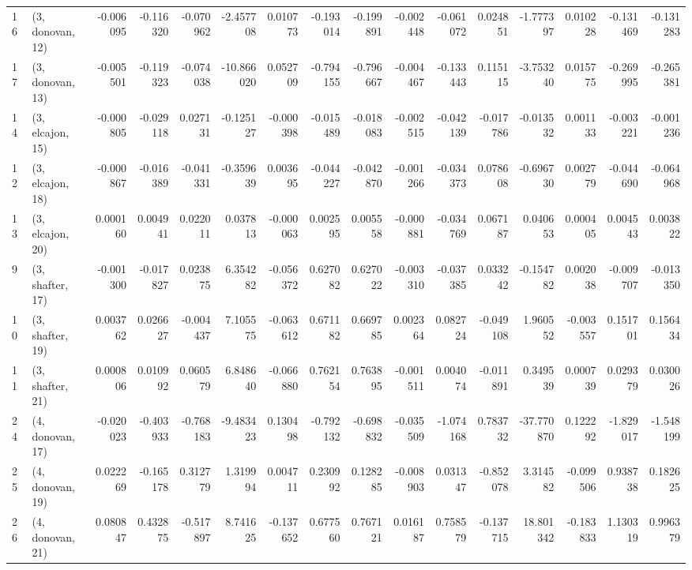 \begin{tabular}{llrrrrrrrrrrrrrr}
16 &  (3, donovan, 12) &  -0.006095 & -0.116320 & -0.070962 &  -2.457708 &  0.010773 &  -0.193014 & -0.199891 & -0.002448 & -0.061072 &  0.024851 &  -1.777397 &  0.010228 & -0.131469 & -0.131283 \\
17 &  (3, donovan, 13) &  -0.005501 & -0.119323 & -0.074038 & -10.866020 &  0.052709 &  -0.794155 & -0.796667 & -0.004467 & -0.133443 &  0.115115 &  -3.753240 &  0.015775 & -0.269995 & -0.265381 \\
14 &  (3, elcajon, 15) &  -0.000805 & -0.029118 &  0.027131 &  -0.125127 & -0.000398 &  -0.015489 & -0.018083 & -0.002515 & -0.042139 & -0.017786 &  -0.013532 &  0.001133 & -0.003221 & -0.001236 \\
12 &  (3, elcajon, 18) &  -0.000867 & -0.016389 & -0.041331 &  -0.359639 &  0.003695 &  -0.044227 & -0.042870 & -0.001266 & -0.034373 &  0.078608 &  -0.696730 &  0.002779 & -0.044690 & -0.064968 \\
13 &  (3, elcajon, 20) &   0.000160 &  0.004941 &  0.022011 &   0.037813 & -0.000063 &   0.002595 &  0.005558 & -0.000881 & -0.034769 &  0.067187 &   0.040653 &  0.000405 &  0.004543 &  0.003822 \\
9  &  (3, shafter, 17) &  -0.001300 & -0.017827 &  0.023875 &   6.354282 & -0.056372 &   0.627082 &  0.627022 & -0.003310 & -0.037385 &  0.033242 &  -0.154782 &  0.002038 & -0.009707 & -0.013350 \\
10 &  (3, shafter, 19) &   0.003762 &  0.026627 & -0.004437 &   7.105575 & -0.063612 &   0.671182 &  0.669785 &  0.002364 &  0.082724 & -0.049108 &   1.960552 & -0.003557 &  0.151701 &  0.156434 \\
11 &  (3, shafter, 21) &   0.000806 &  0.010992 &  0.060579 &   6.848640 & -0.066880 &   0.762154 &  0.763895 & -0.001511 &  0.004074 & -0.011891 &   0.349539 &  0.000739 &  0.029379 &  0.030026 \\
24 &  (4, donovan, 17) &  -0.020023 & -0.403933 & -0.768183 &  -9.483423 &  0.130498 &  -0.792132 & -0.698832 & -0.035509 & -1.074168 &  0.783732 & -37.770870 &  0.122292 & -1.829017 & -1.548199 \\
25 &  (4, donovan, 19) &   0.022269 & -0.165178 &  0.312779 &   1.319994 &  0.004711 &   0.230992 &  0.128285 & -0.008903 &  0.031347 & -0.852078 &   3.314582 & -0.099506 &  0.938738 &  0.182625 \\
26 &  (4, donovan, 21) &   0.080847 &  0.432875 & -0.517897 &   8.741625 & -0.137652 &   0.677560 &  0.767121 &  0.016187 &  0.758579 & -0.137715 &  18.801342 & -0.183833 &  1.130319 &  0.996379 \\

\end{tabular}

